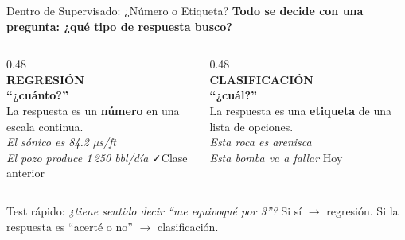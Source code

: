 \documentclass[aspectratio=169, 11pt]{beamer}
\begin{document}
\begin{frame}{Dentro de Supervisado: ¿Número o Etiqueta?}
  \vspace{-6pt}
  {\small\color{arcaDark}\bfseries
    Todo se decide con una pregunta: \textbf{¿qué tipo de respuesta busco?}}

  \vspace{10pt}
  \begin{columns}[T]
    \begin{column}{0.48\textwidth}
      \centering
      {\Large\color{arcaRed}\faRulerHorizontal}\\[6pt]
      {\normalsize\bfseries\color{arcaDark} REGRESIÓN}\\[3pt]
      {\footnotesize\color{arcaRed}\bfseries ``¿cuánto?''}\\[6pt]
      {\scriptsize\color{textMuted}
      La respuesta es un \textbf{número} en una escala continua.\\[5pt]
      \textit{El sónico es 84.2 µs/ft}\\
      \textit{El pozo produce 1\,250 bbl/día}}
      \vspace{5pt}
      {\scriptsize\color{codeGreen} \faCheck\hspace{3pt}Clase anterior}
    \end{column}
    \begin{column}{0.48\textwidth}
      \centering
      {\Large\color{arcaRed}\faTags}\\[6pt]
      {\normalsize\bfseries\color{arcaDark} CLASIFICACIÓN}\\[3pt]
      {\footnotesize\color{arcaRed}\bfseries ``¿cuál?''}\\[6pt]
      {\scriptsize\color{textMuted}
      La respuesta es una \textbf{etiqueta} de una lista de opciones.\\[5pt]
      \textit{Esta roca es arenisca}\\
      \textit{Esta bomba va a fallar}}
      \vspace{5pt}
      {\scriptsize\color{arcaRed} \faStar\hspace{3pt}Hoy}
    \end{column}
  \end{columns}

  \vspace{12pt}
  \centering
  {\footnotesize\color{arcaDark}
    Test rápido: \textit{¿tiene sentido decir ``me equivoqué por 3''?}
    Si sí \(\to\) regresión. Si la respuesta es ``acerté o no'' \(\to\) clasificación.}
\end{frame}
\end{document}
